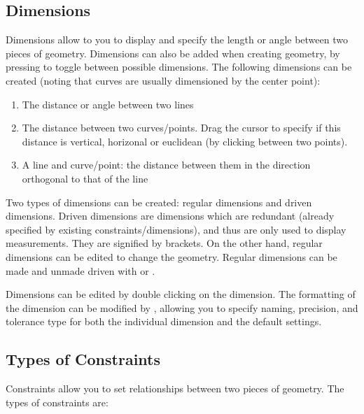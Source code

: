 \cbend

\subsection{Dimensions}
\cbstart
Dimensions allow to you to display and specify the length or angle between two pieces of geometry. Dimensions can also be added when creating geometry, by pressing  to toggle between possible dimensions. The following dimensions can be created (noting that curves are usually dimensioned by the center point):

\begin{enumerate}
\item The distance or angle between two lines
\item The distance between two curves/points. Drag the cursor to specify if this distance is vertical, horizonal or euclidean (by clicking between two points).
\item A line and curve/point: the distance between them in the direction orthogonal to that of the line
\end{enumerate}

Two types of dimensions can be created: regular dimensions and driven dimensions. Driven dimensions are dimensions which are redundant (already specified by existing constraints/dimensions), and thus are only used to display measurements. They are signified by brackets. On the other hand, regular dimensions can be edited to change the geometry. Regular dimensions can be made and unmade driven with  or .

Dimensions can be edited by double clicking on the dimension. The formatting of the dimension can be modified by , allowing you to specify naming, precision, and tolerance type for both the individual dimension and the default settings.

\cbend

\subsection{Types of Constraints}

\cbstart

Constraints allow you to set relationships between two pieces of geometry. The types of constraints are:

